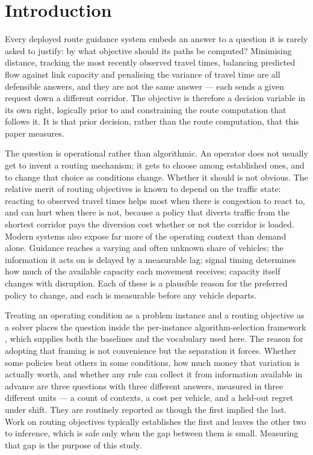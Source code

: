 \documentclass[preprint,12pt]{elsarticle}
\begin{document}
\section{Introduction}
\label{sec:intro}

Every deployed route guidance system embeds an answer to a question it is rarely
asked to justify: by what objective should its paths be computed? Minimising
distance, tracking the most recently observed travel times, balancing predicted
flow against link capacity and penalising the variance of travel time are all
defensible answers, and they are not the same answer --- each sends a given
request down a different corridor. The objective is therefore a decision
variable in its own right, logically prior to and constraining the route
computation that follows it. It is that prior decision, rather than the route
computation, that this paper measures.

The question is operational rather than algorithmic. An operator does not
usually get to invent a routing mechanism; it gets to choose among established
ones, and to change that choice as conditions change. Whether it should is not
obvious. The relative merit of routing objectives is known to depend on the
traffic state: reacting to observed travel times helps most when there is
congestion to react to, and can hurt when there is not, because a policy that
diverts traffic from the shortest corridor pays the diversion cost whether or
not the corridor is loaded. Modern systems also expose far more of the operating
context than demand alone. Guidance reaches a varying and often unknown share of
vehicles; the information it acts on is delayed by a measurable lag; signal
timing determines how much of the available capacity each movement receives;
capacity itself changes with disruption. Each of these is a plausible reason for
the preferred policy to change, and each is measurable before any vehicle
departs.

Treating an operating condition as a problem instance and a routing objective as
a solver places the question inside the per-instance algorithm-selection
framework \citep{rice1976,bischl2016aslib}, which supplies both the baselines
and the vocabulary used here. The reason for adopting that framing is not
convenience but the separation it forces. Whether some policies beat others in
some conditions, how much money that variation is actually worth, and whether
any rule can collect it from information available in advance are three
questions with three different answers, measured in three different units --- a
count of contexts, a cost per vehicle, and a held-out regret under shift. They
are routinely reported as though the first implied the last. Work on routing
objectives typically establishes the first and leaves the other two to
inference, which is safe only when the gap between them is small. Measuring that
gap is the purpose of this study.
\end{document}
